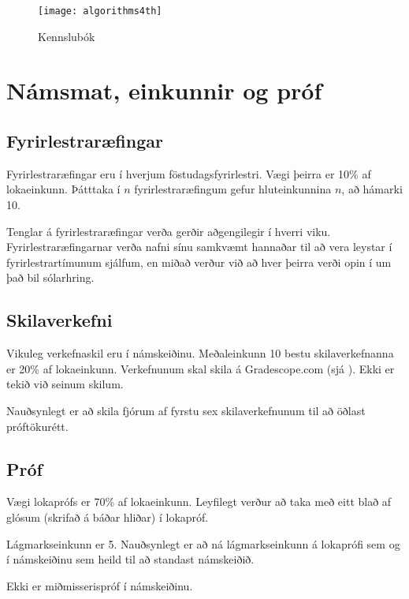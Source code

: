 \documentclass{article}
\begin{document}

\begin{figure}
\caption{Kennslubók}
\begin{center}
\texttt{[image: algorithms4th]}
\end{center}
\end{figure}

\newpage
\section{Námsmat, einkunnir og próf}
\subsection{Fyrirlestraræfingar}
\label{sec:lecture-exercises}
Fyrirlestraræfingar eru í hverjum föstudagsfyrirlestri. Vægi þeirra er 10\% af lokaeinkunn. Þátttaka í $n$ fyrirlestraræfingum gefur hluteinkunnina $n$, að hámarki 10.

Tenglar á fyrirlestraræfingar verða gerðir aðgengilegir í hverri viku. Fyrirlestraræfingarnar verða nafni sínu samkvæmt hannaðar til að vera leystar í fyrirlestrartímunum sjálfum, en miðað verður við að hver þeirra verði opin í um það bil sólarhring.
\subsection{Skilaverkefni}
Vikuleg verkefnaskil eru í námskeiðinu. Meðaleinkunn 10 bestu skilaverkefnanna er 20\% af lokaeinkunn. Verkefnunum skal skila á Gradescope.com (sjá ). Ekki er tekið við seinum skilum.

Nauðsynlegt er að skila fjórum af fyrstu sex skilaverkefnunum til að öðlast próftökurétt.
\subsection{Próf}
Vægi lokaprófs er 70\% af lokaeinkunn. Leyfilegt verður að taka með eitt blað af glósum (skrifað á báðar hliðar) í lokapróf.

Lágmarkseinkunn er 5. Nauðsynlegt er að ná lágmarkseinkunn á lokaprófi sem og í námskeiðinu sem heild til að standast námskeiðið. 

Ekki er miðmisserispróf í námskeiðinu.
\end{document}
